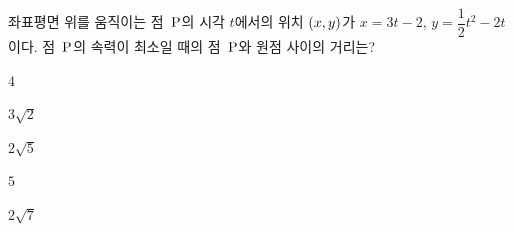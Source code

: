좌표평면 위를 움직이는 점~$\mathrm{P}$의 시각 $t$에서의 위치 $(x{,}\mkern3mu\mathopen{}y)$가 $x=3t-2$, $y=\dfrac{1}{2}t^2-2t$이다. 점~$\mathrm{P}$의 속력이 최소일 때의 점~$\mathrm{P}$와 원점 사이의 거리는?
\begin{choices32}{\rule[-3ex]{0pt}{8ex}$4$}{\rule[-3ex]{0pt}{8ex}$3\sqrt{2}$}{\rule[-3ex]{0pt}{8ex}$2\sqrt{5}$}{\rule[-3ex]{0pt}{8ex}$5$}{\rule[-3ex]{0pt}{8ex}$2\sqrt{7}$}\end{choices32}
